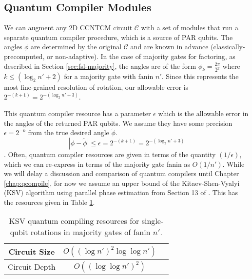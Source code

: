 \subsection{Quantum Compiler Modules}

We can augment any \textsf{2D CCNTCM} circuit $\mathcal{C}$ with a set of modules that run a
separate quantum compiler procedure, which is a source of PAR qubits.
The angles $\phi$ are determined by
the original $\mathcal{C}$ and are known in advance (classically-precomputed,
or non-adaptive). In the case of majority gates for factoring,
as described in Section \ref{sec:fsl-majority}, the angles are of the
form $\phi_k = \frac{2\pi}{2^k}$ where $k \le (\log_2 n' + 2)$ for a majority
gate with fanin $n'$. Since this represents the most fine-grained resolution of
rotation, our allowable error is $2^{-(k+1)} = 2^{-(\log_2 n' + 3)}$.

This quantum compiler resource has a parameter $\epsilon$ which is the
allowable error in the angles of the returned PAR qubits.
We assume they have some precision $\epsilon = 2^{-k}$ from the
true desired angle $\tilde{\phi}$.
%
\begin{equation}
| \phi - \tilde{\phi} | \le \epsilon = 2^{-(k+1)} = 2^{-(\log_2 n' + 3)}
\end{equation}.
%
Often, quantum compiler resources are given in terms of the quantity
$(1/\epsilon)$, which we can re-express in terms of the
majority gate fanin as $O(1/n')$. 
While we will delay a discussion and comparison of
quantum compilers until Chapter \ref{chap:qcompile}, for now
we assume an upper bound of the Kitaev-Shen-Vyalyi (KSV) algorithm
using parallel phase estimation from Section 13 of \cite{Kitaev2002}.
This has the resources given in Table \ref{tab:fsl-ksv}.

\begin{table}[tbp!]
\begin{center}
\begin{tabular}{|c|c|c|}
\hline
Circuit Size & $O((\log n')^2\log\log n')$ \\
\hline
Circuit Depth & $O((\log\log n')^2)$\\
\hline
\end{tabular}
\caption{KSV quantum compiling resources for single-qubit rotations in majority gates of fanin $n'$.}
\label{tab:fsl-ksv}
\end{center}
\end{table}

